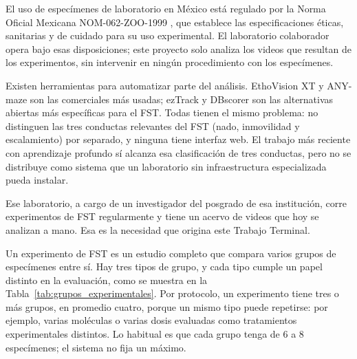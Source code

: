 El uso de especímenes de laboratorio en México está regulado por la Norma Oficial Mexicana
NOM-062-ZOO-1999 \cite{nom062}, que establece las especificaciones éticas, sanitarias
y de cuidado para su uso experimental. El laboratorio colaborador
opera bajo esas disposiciones; este proyecto solo analiza los videos que resultan de
los experimentos, sin intervenir en ningún procedimiento con los especímenes.

Existen herramientas para automatizar parte del análisis. EthoVision XT
\cite{noldus_ethovision} y ANY-maze \cite{stoelting_anymaze} son las comerciales más usadas; ezTrack
\cite{pennington2019_eztrack} y DBscorer \cite{nandi2021_dbscorer} son las alternativas
abiertas más específicas para el FST. Todas tienen el mismo problema: no distinguen las
tres conductas relevantes del FST (nado, inmovilidad y escalamiento) por separado, y
ninguna tiene interfaz web. El trabajo más reciente con aprendizaje profundo
\cite{della_valle2025} sí alcanza esa clasificación de tres conductas, pero no se
distribuye como sistema que un laboratorio sin infraestructura especializada pueda
instalar.

Ese laboratorio, a cargo de un investigador del posgrado de esa institución, corre experimentos de FST
regularmente y tiene un acervo de videos que hoy se analizan a mano. Esa es la
necesidad que origina este Trabajo Terminal.

Un experimento de FST es un estudio completo que compara varios grupos de especímenes
entre sí. Hay tres tipos de grupo, y cada tipo cumple un papel distinto en la evaluación,
como se muestra en la Tabla~\ref{tab:grupos_experimentales}. Por protocolo, un experimento tiene tres o
más grupos, en promedio cuatro, porque un mismo tipo puede repetirse: por ejemplo, varias
moléculas o varias dosis evaluadas como tratamientos experimentales distintos. Lo habitual
es que cada grupo tenga de 6 a 8 especímenes; el sistema no fija un máximo.

